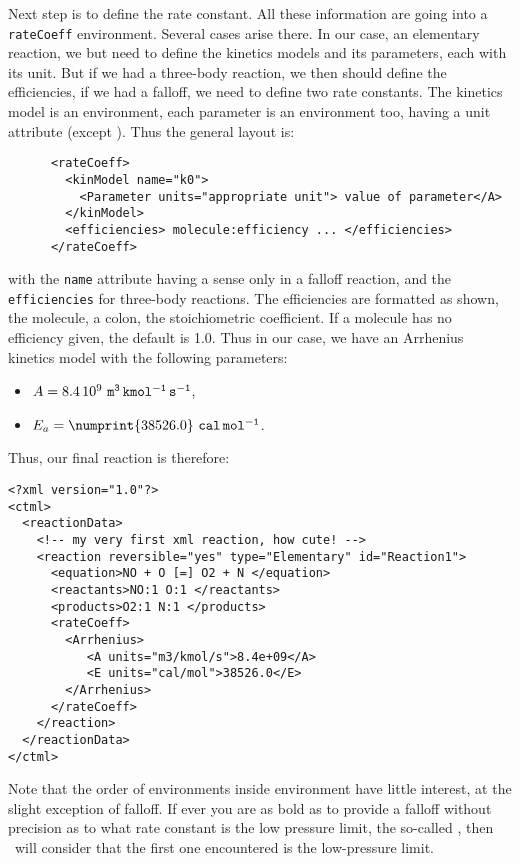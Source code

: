 Next step is to define the rate constant. All these information
are going into a \verb!rateCoeff! environment. Several cases arise
there. In our case, an elementary reaction, we but need to define
the kinetics models and its parameters, each with its unit. But
if we had a three-body reaction, we then should define the efficiencies,
if we had a falloff, we need to define two rate constants.
The kinetics model is an environment, each parameter is an environment
too, having a unit attribute (except \Power).
Thus the general layout is:
\begin{verbatim}
      <rateCoeff>
        <kinModel name="k0">
          <Parameter units="appropriate unit"> value of parameter</A>
        </kinModel>
        <efficiencies> molecule:efficiency ... </efficiencies>
      </rateCoeff>
\end{verbatim}
with the \verb!name! attribute having a sense only in a falloff
reaction, and the \verb!efficiencies! for three-body reactions.
The efficiencies are formatted as shown, the molecule, a colon, the
stoichiometric coefficient. If a molecule has no efficiency
given, the default is 1.0.
Thus in our case, we have an Arrhenius kinetics model with the
following parameters:
\begin{itemize}
\item $A = 8.4\,10^9~\mathtt{m^3\,kmol^{-1}\,s^{-1}}$,
\item $\AcEn = \numprint{38526.0}~\unit{cal\,mol^{-1}}$.
\end{itemize}
Thus, our final reaction is therefore:
\begin{verbatim}
<?xml version="1.0"?>
<ctml>
  <reactionData>
    <!-- my very first xml reaction, how cute! -->
    <reaction reversible="yes" type="Elementary" id="Reaction1">
      <equation>NO + O [=] O2 + N </equation>
      <reactants>NO:1 O:1 </reactants>
      <products>O2:1 N:1 </products>
      <rateCoeff>
        <Arrhenius>
           <A units="m3/kmol/s">8.4e+09</A>
           <E units="cal/mol">38526.0</E>
        </Arrhenius>
      </rateCoeff>
    </reaction>
  </reactionData>
</ctml>
\end{verbatim}
Note that the order of environments inside environment have little
interest, at the slight exception of falloff. If ever you are
as bold as to provide a falloff without precision as to what rate
constant is the low pressure limit, the so-called \kinModZ, then
\Antioch\ will consider that the first one encountered is the
low-pressure limit.

